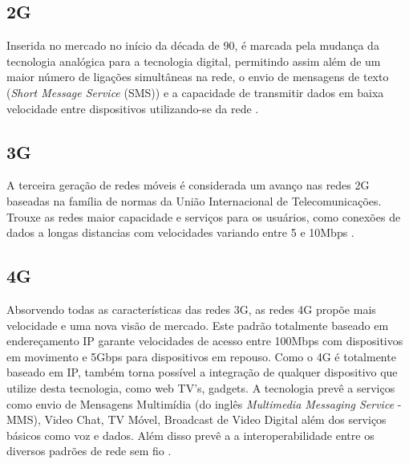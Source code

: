 \subsection{2G}
Inserida no mercado no início da década de 90, é marcada pela mudança da tecnologia analógica para a tecnologia digital, permitindo assim além de um maior número de ligações simultâneas na rede, o envio de mensagens de texto (\emph{Short Message Service} (SMS)) e a capacidade de transmitir dados em baixa velocidade entre dispositivos utilizando-se da rede \cite{GeracoesTelefoniaMovel}.

\subsection{3G}
A terceira geração de redes móveis é considerada um avanço nas redes 2G baseadas na família de normas da União Internacional de Telecomunicações. Trouxe as redes maior capacidade e serviços para os usuários, como conexões de dados a longas distancias com velocidades variando entre 5 e 10Mbps \cite{GeracoesTelefoniaMovel}.

\subsection{4G}
Absorvendo todas as características das redes 3G, as redes 4G propõe mais velocidade e uma nova visão de mercado. Este padrão totalmente baseado em endereçamento IP garante velocidades de acesso entre 100Mbps com dispositivos em movimento e 5Gbps para dispositivos em repouso. Como o 4G é totalmente baseado em IP, também torna possível a integração de qualquer dispositivo que utilize desta tecnologia, como web TV's, gadgets. A tecnologia prevê a serviços como envio de Mensagens Multimídia (do inglês \emph{Multimedia Messaging Service} - MMS), Video Chat, TV Móvel, Broadcast de Video Digital além dos serviços básicos como voz e dados. Além disso prevê a a interoperabilidade entre os diversos padrões de rede sem fio \cite{GeracoesTelefoniaMovel}.
